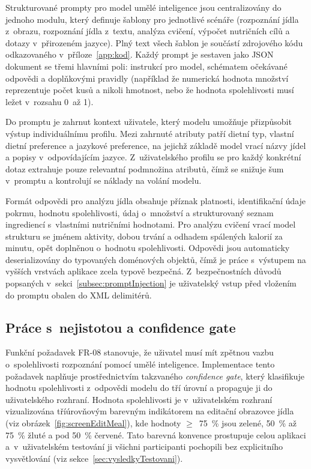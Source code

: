 Strukturované prompty pro model umělé inteligence jsou centralizovány do jednoho modulu, který definuje šablony pro jednotlivé scénáře (rozpoznání jídla z~obrazu, rozpoznání jídla z~textu, analýza cvičení, výpočet nutričních cílů a dotazy v~přirozeném jazyce).
Plný text všech šablon je součástí zdrojového kódu odkazovaného v~příloze~\ref{app:kod}.
Každý prompt je sestaven jako JSON dokument se třemi hlavními poli: instrukcí pro model, schématem očekávané odpovědi a doplňkovými pravidly (například že numerická hodnota množství reprezentuje počet kusů a nikoli hmotnost, nebo že hodnota spolehlivosti musí ležet v~rozsahu 0~až 1).

Do promptu je zahrnut kontext uživatele, který modelu umožňuje přizpůsobit výstup individuálnímu profilu.
Mezi zahrnuté atributy patří dietní typ, vlastní dietní preference a jazykové preference, na jejichž základě model vrací názvy jídel a popisy v~odpovídajícím jazyce.
Z~uživatelského profilu se pro každý konkrétní dotaz extrahuje pouze relevantní podmnožina atributů, čímž se snižuje šum v~promptu a kontrolují se náklady na volání modelu.

Formát odpovědi pro analýzu jídla obsahuje příznak platnosti, identifikační údaje pokrmu, hodnotu spolehlivosti, údaj o~množství a strukturovaný seznam ingrediencí s~vlastními nutričními hodnotami.
Pro analýzu cvičení vrací model strukturu se jménem aktivity, dobou trvání a odhadem spálených kalorií za minutu, opět doplněnou o~hodnotu spolehlivosti.
Odpovědi jsou automaticky deserializovány do typovaných doménových objektů, čímž je práce s~výstupem na vyšších vrstvách aplikace zcela typově bezpečná.
Z~bezpečnostních důvodů popsaných v~sekci~\ref{subsec:promptInjection} je uživatelský vstup před vložením do promptu obalen do XML delimitérů.

\subsection{Práce s~nejistotou a confidence gate}
\label{subsec:confidence}

Funkční požadavek FR-08 stanovuje, že uživatel musí mít zpětnou vazbu o~spolehlivosti rozpoznání pomocí umělé inteligence.
Implementace tento požadavek naplňuje prostřednictvím takzvaného \emph{confidence gate}, který klasifikuje hodnotu spolehlivosti z~odpovědi modelu do tří úrovní a propaguje ji do uživatelského rozhraní.
Hodnota spolehlivosti je v~uživatelském rozhraní vizualizována tříúrovňovým barevným indikátorem na editační obrazovce jídla (viz obrázek~\ref{fig:screenEditMeal}), kde hodnoty $\geq$~75~\% jsou zelené, 50~\% až 75~\% žluté a pod 50~\% červené.
Tato barevná konvence prostupuje celou aplikaci a~v~uživatelském testování ji všichni participanti pochopili bez explicitního vysvětlování (viz sekce~\ref{sec:vysledkyTestovani}).

